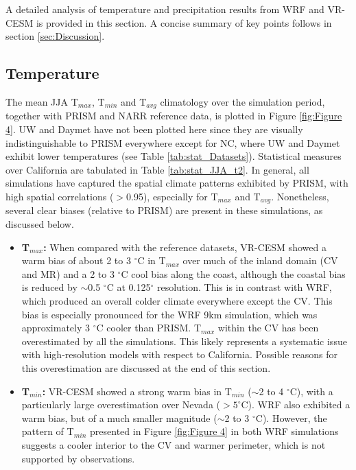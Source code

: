 \documentclass[ms,draft]{agutex}   %
\begin{document}
\begin{article}
A detailed analysis of temperature and precipitation results from WRF and VR-CESM is provided in this section.  A concise summary of key points follows in section \ref{sec:Discussion}.

\subsection{Temperature}

The mean JJA T$_{max}$, T$_{min}$ and T$_{avg}$ climatology over the simulation period, together with PRISM and NARR reference data, is plotted in Figure \ref{fig:Figure 4}. UW and Daymet have not been plotted here since they are visually indistinguishable to PRISM everywhere except for NC, where UW and Daymet exhibit lower temperatures (see Table \ref{tab:stat_Datasets}).  Statistical measures over California are tabulated in Table \ref{tab:stat_JJA_t2}. In general, all simulations have captured the spatial climate patterns exhibited by PRISM, with high spatial correlations ($>$0.95), especially for T$_{max}$ and T$_{avg}$.  Nonetheless, several clear biases (relative to PRISM) are present in these simulations, as discussed below.

\begin{itemize}
\item{} \textbf{T$_{max}$:}  When compared with the reference datasets, VR-CESM showed a warm bias of about 2 to 3 $^\circ$C in T$_{max}$ over much of the inland domain (CV and MR) and a 2 to 3 $^\circ$C cool bias along the coast, although the coastal bias is reduced by $\sim$0.5 $^\circ$C at 0.125$^\circ$ resolution. This is in contrast with WRF, which produced an overall colder climate everywhere except the CV.  This bias is especially pronounced for the WRF 9km simulation, which was approximately 3 $^\circ$C cooler than PRISM. T$_{max}$ within the CV has been overestimated by all the simulations. This likely represents a systematic issue with high-resolution models with respect to California.  Possible reasons for this overestimation are discussed at the end of this section.


\item{} \textbf{T$_{min}$:}  VR-CESM showed a strong warm bias in T$_{min}$ ($\sim$2 to 4 $^\circ$C), with a particularly large overestimation over Nevada ($> 5 ^\circ$C). WRF also exhibited a warm bias, but of a much smaller magnitude ($\sim$2 to 3 $^\circ$C). However, the pattern of T$_{min}$ presented in Figure \ref{fig:Figure 4} in both WRF simulations suggests a cooler interior to the CV and warmer perimeter, which is not supported by observations.


\end{itemize}
\end{article}
\end{document}
